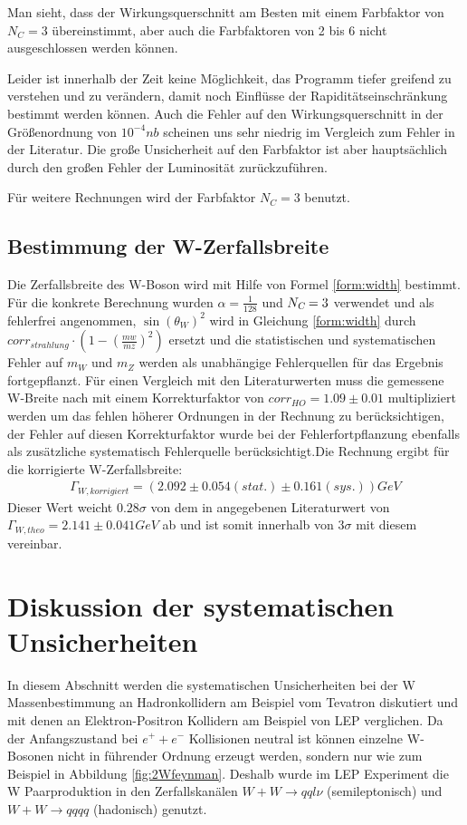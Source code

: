 \documentclass[a4paper,12pt]{article}
\begin{document}
Man sieht, dass der Wirkungsquerschnitt am Besten mit einem Farbfaktor von $N_C = 3$ übereinstimmt,
aber auch die Farbfaktoren von 2 bis 6 nicht ausgeschlossen werden können.

Leider ist innerhalb der Zeit keine Möglichkeit, das Programm tiefer greifend zu verstehen und zu
verändern, damit noch Einflüsse der Rapiditätseinschränkung bestimmt werden können. Auch die Fehler
auf den Wirkungsquerschnitt in der Größenordnung von $10^{-4}\si{nb}$ scheinen uns sehr niedrig im
Vergleich zum Fehler in der Literatur.
Die große Unsicherheit auf den Farbfaktor ist aber hauptsächlich durch den großen Fehler der
Luminosität zurückzuführen.

Für weitere Rechnungen wird der Farbfaktor $N_C = 3$ benutzt.

\subsection{Bestimmung der W-Zerfallsbreite}
Die Zerfallsbreite des W-Boson wird mit Hilfe von Formel \ref{form:width} bestimmt. Für die konkrete Berechnung
wurden $\alpha = \frac{1}{128}$ und $N_{\textsl{C}}=3$ verwendet und als fehlerfrei angenommen, $\sin(\theta_{W})^{2} $
wird in Gleichung \ref{form:width} durch $corr_{strahlung}\cdot(1-(\frac{mw}{mz})^{2})$ ersetzt und die statistischen und
systematischen Fehler auf $m_{W}$ und $m_{Z}$ werden als unabhängige Fehlerquellen für das Ergebnis fortgepflanzt. Für 
einen Vergleich mit den Literaturwerten muss die gemessene W-Breite nach \cite{versuchsanleitung} mit einem Korrekturfaktor
von $corr_{HO}=1.09 \pm 0.01$ multipliziert werden um das fehlen höherer Ordnungen in der Rechnung zu berücksichtigen, der
Fehler auf diesen Korrekturfaktor wurde bei der Fehlerfortpflanzung ebenfalls als zusätzliche systematisch Fehlerquelle
berücksichtigt.Die Rechnung ergibt für die korrigierte W-Zerfallsbreite:
\begin{align*}
	Γ_{W,korrigiert} = ( 2.092 ± 0.054 (stat.) ± 0.161(sys.)) \si{GeV}
\end{align*}
Dieser Wert weicht $0.28\sigma$ von dem in \cite{versuchsanleitung} angegebenen Literaturwert von
$Γ_{W,theo} = 2.141 \pm 0.041\si{GeV}$
ab und ist somit innerhalb von $3\sigma$ mit diesem vereinbar.

\newpage
\section{Diskussion der systematischen Unsicherheiten}
In diesem Abschnitt werden die systematischen Unsicherheiten bei der W Massenbestimmung an Hadronkollidern am Beispiel vom Tevatron diskutiert
und mit denen an Elektron-Positron Kollidern am Beispiel von LEP verglichen. Da der Anfangszustand bei $e^{+}+e^{-}$ Kollisionen neutral ist können einzelne W-Bosonen
nicht in führender Ordnung erzeugt werden, sondern nur wie zum Beispiel in Abbildung \ref{fig:2Wfeynman}. Deshalb wurde im LEP Experiment die W Paarproduktion in den \cite{Achard:2005qy}
Zerfallskanälen $W+W \rightarrow qql\nu$ (semileptonisch) und $W+W \rightarrow qqqq$ (hadonisch) genutzt.
\end{document}
